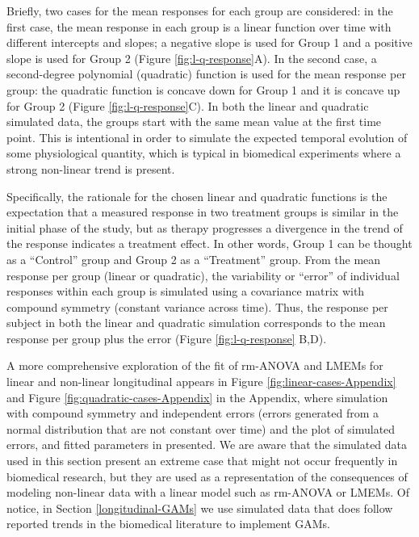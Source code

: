 \documentclass[
]{article}
\begin{document}
Briefly, two cases for the mean responses for each group are considered: in the first case, the mean response in each group is a linear function over time with different intercepts and slopes; a negative slope is used for Group 1 and a positive slope is used for Group 2 (Figure \ref{fig:l-q-response}A). In the second case, a second-degree polynomial (quadratic) function is used for the mean response per group: the quadratic function is concave down for Group 1 and it is concave up for Group 2 (Figure \ref{fig:l-q-response}C). In both the linear and quadratic simulated data, the groups start with the same mean value at the first time point. This is intentional in order to simulate the expected temporal evolution of some physiological quantity, which is typical in biomedical experiments where a strong non-linear trend is present.

Specifically, the rationale for the chosen linear and quadratic functions is the expectation that a measured response in two treatment groups is similar in the initial phase of the study, but as therapy progresses a divergence in the trend of the response indicates a treatment effect. In other words, Group 1 can be thought as a ``Control'' group and Group 2 as a ``Treatment'' group. From the mean response per group (linear or quadratic), the variability or ``error'' of individual responses within each group is simulated using a covariance matrix with compound symmetry (constant variance across time). Thus, the response per subject in both the linear and quadratic simulation corresponds to the mean response per group plus the error (Figure \ref{fig:l-q-response} B,D).

A more comprehensive exploration of the fit of rm-ANOVA and LMEMs for linear and non-linear longitudinal appears in Figure \ref{fig:linear-cases-Appendix} and Figure \ref{fig:quadratic-cases-Appendix} in the Appendix, where simulation with compound symmetry and independent errors (errors generated from a normal distribution that are not constant over time) and the plot of simulated errors, and fitted parameters in presented. We are aware that the simulated data used in this section present an extreme case that might not occur frequently in biomedical research, but they are used as a representation of the consequences of modeling non-linear data with a linear model such as rm-ANOVA or LMEMs. Of notice, in Section \ref{longitudinal-GAMs} we use simulated data that does follow reported trends in the biomedical literature to implement GAMs.
\end{document}
